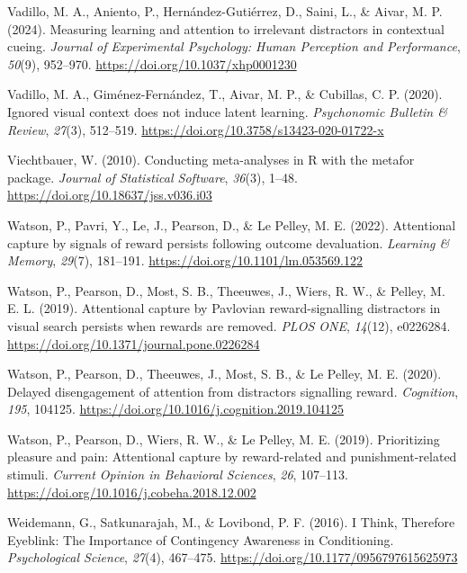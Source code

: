 \documentclass[
  man,
  floatsintext,
  longtable,
  nolmodern,
  notxfonts,
  notimes,
  mask,
  colorlinks=true,linkcolor=blue,citecolor=blue,urlcolor=blue]{apa7}
\newlength{\cslhangindent}
\newenvironment{CSLReferences}[2] %
 {\begin{list}{}{%
  \setlength{\itemindent}{0pt}
  \setlength{\leftmargin}{0pt}
  \setlength{\parsep}{0pt}
  \ifodd #1
   \setlength{\leftmargin}{\cslhangindent}
   \setlength{\itemindent}{-1\cslhangindent}
  \fi
  \setlength{\itemsep}{#2\baselineskip}}}
 {\end{list}}
\begin{document}
\begin{CSLReferences}{1}{0}
Vadillo, M. A., Aniento, P., Hernández-Gutiérrez, D., Saini, L., \&
Aivar, M. P. (2024). Measuring learning and attention to irrelevant
distractors in contextual cueing. \emph{Journal of Experimental
Psychology: Human Perception and Performance}, \emph{50}(9), 952--970.
\url{https://doi.org/10.1037/xhp0001230}

Vadillo, M. A., Giménez-Fernández, T., Aivar, M. P., \& Cubillas, C. P.
(2020). Ignored visual context does not induce latent learning.
\emph{Psychonomic Bulletin \& Review}, \emph{27}(3), 512--519.
\url{https://doi.org/10.3758/s13423-020-01722-x}

Viechtbauer, W. (2010). Conducting meta-analyses in {R} with the
{metafor} package. \emph{Journal of Statistical Software}, \emph{36}(3),
1--48. \url{https://doi.org/10.18637/jss.v036.i03}

Watson, P., Pavri, Y., Le, J., Pearson, D., \& Le Pelley, M. E. (2022).
Attentional capture by signals of reward persists following outcome
devaluation. \emph{Learning \& Memory}, \emph{29}(7), 181--191.
\url{https://doi.org/10.1101/lm.053569.122}

Watson, P., Pearson, D., Most, S. B., Theeuwes, J., Wiers, R. W., \&
Pelley, M. E. L. (2019). Attentional capture by Pavlovian
reward-signalling distractors in visual search persists when rewards are
removed. \emph{PLOS ONE}, \emph{14}(12), e0226284.
\url{https://doi.org/10.1371/journal.pone.0226284}

Watson, P., Pearson, D., Theeuwes, J., Most, S. B., \& Le Pelley, M. E.
(2020). Delayed disengagement of attention from distractors signalling
reward. \emph{Cognition}, \emph{195}, 104125.
\url{https://doi.org/10.1016/j.cognition.2019.104125}

Watson, P., Pearson, D., Wiers, R. W., \& Le Pelley, M. E. (2019).
Prioritizing pleasure and pain: Attentional capture by reward-related
and punishment-related stimuli. \emph{Current Opinion in Behavioral
Sciences}, \emph{26}, 107--113.
\url{https://doi.org/10.1016/j.cobeha.2018.12.002}

Weidemann, G., Satkunarajah, M., \& Lovibond, P. F. (2016). I Think,
Therefore Eyeblink: The Importance of Contingency Awareness in
Conditioning. \emph{Psychological Science}, \emph{27}(4), 467--475.
\url{https://doi.org/10.1177/0956797615625973}


\end{CSLReferences}
\end{document}
